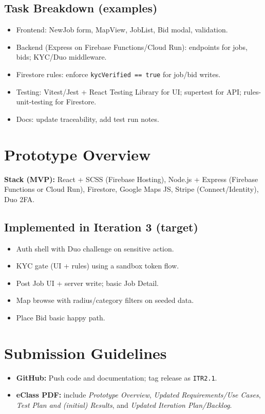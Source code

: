 \documentclass[11pt]{article}
\begin{document}
\subsection*{Task Breakdown (examples)}
\begin{itemize}[leftmargin=1.4em]
  \item Frontend: NewJob form, MapView, JobList, Bid modal, validation.
  \item Backend (Express on Firebase Functions/Cloud Run): endpoints for jobs, bids; KYC/Duo middleware.
  \item Firestore rules: enforce \texttt{kycVerified == true} for job/bid writes.
  \item Testing: Vitest/Jest + React Testing Library for UI; supertest for API; rules-unit-testing for Firestore.
  \item Docs: update traceability, add test run notes.
\end{itemize}

\section{Prototype Overview}
\textbf{Stack (MVP):} React + SCSS (Firebase Hosting), Node.js + Express (Firebase Functions or Cloud Run), Firestore, Google Maps JS, Stripe (Connect/Identity), Duo 2FA.

\subsection*{Implemented in Iteration 3 (target)}
\begin{itemize}[leftmargin=1.4em]
  \item Auth shell with Duo challenge on sensitive action.
  \item KYC gate (UI + rules) using a sandbox token flow.
  \item Post Job UI + server write; basic Job Detail.
  \item Map browse with radius/category filters on seeded data.
  \item Place Bid basic happy path.
\end{itemize}

\section{Submission Guidelines}
\begin{itemize}[leftmargin=1.4em]
  \item \textbf{GitHub:} Push code and documentation; tag release as \texttt{ITR2.1}.
  \item \textbf{eClass PDF:} include \textit{Prototype Overview}, \textit{Updated Requirements/Use Cases}, \textit{Test Plan and (initial) Results}, and \textit{Updated Iteration Plan/Backlog}.
\end{itemize}
\end{document}
